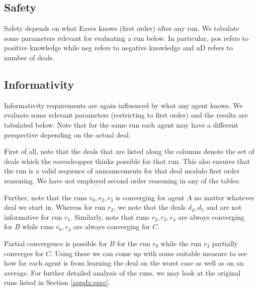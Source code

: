 \documentclass{article}
\begin{document}
\subsection{Safety}
Safety depends on what Eaves knows (first order) after
any run. We tabulate some parameters relevant for
evaluating a run below. In particular, pos refers
to positive knowledge while neg refers to negative
knowledge and nD refers to number of deals.



\subsection{Informativity}
Informativity requirements are again influenced
by what any agent knows. We evaluate some relevant 
parameters (restricting to first order) and the results
are tabulated below. Note that for the same run each
agent may have a different perspective depending on the
actual deal.



First of all, note that the deals that are listed
along the columns denote the set of deals which the
eavesdropper thinks possible for that run. This also
ensures that the run is a valid sequence of announcements
for that deal modulo first order reasoning. We have not
employed second order reasoning in any of the tables.

Further, note that the runs $r_0, r_2, r_3$ is converging for
agent $A$ no matter whatever deal we start in. Whereas for
run $r_2$, we note that the deals $d_4, d_5$ and are not
informative for run $r_1$. Similarly, note that runs 
$r_2, r_3, r_4$ are always converging for $B$ while 
runs $r_0, r_4$ are always converging for $C$.

Partial convergence is possible for $B$ for the
run $r_0$ while the run $r_3$ partially converges
for $C$. Using these we can come up with some suitable
measure to see how far each agent is from learning the
deal on the worst case as well as on an average.
For further detailed analysis of the runs,
we may look at the original runs 
listed in Section \ref{appdx:exec}.

\newpage
\appendix

\end{document}
